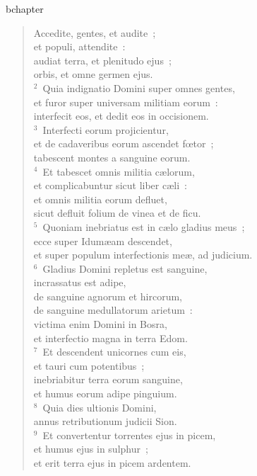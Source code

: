bchapter\begin{verse}\vspace{-19pt}Accedite, gentes, et audite~;\\ et populi, attendite~:\\ audiat terra, et plenitudo ejus~;\\ orbis, et omne germen ejus.\\
${}^{2}$~Quia indignatio Domini super omnes gentes,\\ et furor super universam militiam eorum~:\\ interfecit eos, et dedit eos in occisionem.\\
${}^{3}$~Interfecti eorum projicientur,\\ et de cadaveribus eorum ascendet fœtor~;\\ tabescent montes a sanguine eorum.\\
${}^{4}$~Et tabescet omnis militia c\ae lorum,\\ et complicabuntur sicut liber c\ae li~:\\ et omnis militia eorum defluet,\\ sicut defluit folium de vinea et de ficu.\\
${}^{5}$~Quoniam inebriatus est in c\ae lo gladius meus~;\\ ecce super Idum\ae am descendet,\\ et super populum interfectionis me\ae , ad judicium.\\
${}^{6}$~Gladius Domini repletus est sanguine,\\ incrassatus est adipe,\\ de sanguine agnorum et hircorum,\\ de sanguine medullatorum arietum~:\\ victima enim Domini in Bosra,\\ et interfectio magna in terra Edom.\\
${}^{7}$~Et descendent unicornes cum eis,\\ et tauri cum potentibus~;\\ inebriabitur terra eorum sanguine,\\ et humus eorum adipe pinguium.\\
${}^{8}$~Quia dies ultionis Domini,\\ annus retributionum judicii Sion.\\
${}^{9}$~Et convertentur torrentes ejus in picem,\\ et humus ejus in sulphur~;\\ et erit terra ejus in picem ardentem.\\

\end{verse}
